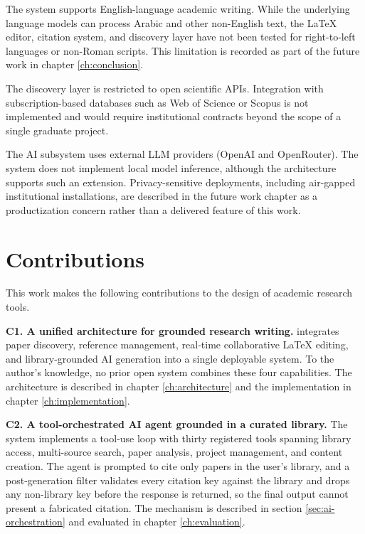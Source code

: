 The system supports English-language academic writing. While the underlying language models can process Arabic and other non-English text, the LaTeX editor, citation system, and discovery layer have not been tested for right-to-left languages or non-Roman scripts. This limitation is recorded as part of the future work in chapter \ref{ch:conclusion}.

The discovery layer is restricted to open scientific APIs. Integration with subscription-based databases such as Web of Science or Scopus is not implemented and would require institutional contracts beyond the scope of a single graduate project.

The AI subsystem uses external LLM providers (OpenAI and OpenRouter). The system does not implement local model inference, although the architecture supports such an extension. Privacy-sensitive deployments, including air-gapped institutional installations, are described in the future work chapter as a productization concern rather than a delivered feature of this work.

\section{Contributions}
\label{sec:contributions}

This work makes the following contributions to the design of academic research tools.

\textbf{C1. A unified architecture for grounded research writing.} \sh{} integrates paper discovery, reference management, real-time collaborative LaTeX editing, and library-grounded AI generation into a single deployable system. To the author's knowledge, no prior open system combines these four capabilities. The architecture is described in chapter \ref{ch:architecture} and the implementation in chapter \ref{ch:implementation}.

\textbf{C2. A tool-orchestrated AI agent grounded in a curated library.} The system implements a tool-use loop with thirty registered tools spanning library access, multi-source search, paper analysis, project management, and content creation. The agent is prompted to cite only papers in the user's library, and a post-generation filter validates every citation key against the library and drops any non-library key before the response is returned, so the final output cannot present a fabricated citation. The mechanism is described in section \ref{sec:ai-orchestration} and evaluated in chapter \ref{ch:evaluation}.

